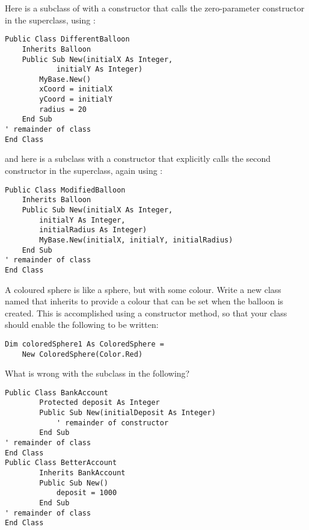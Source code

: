 		Here is a subclass of  with a constructor that calls the zero-parameter constructor in the superclass, using :
		\begin{lstlisting}
Public Class DifferentBalloon
	Inherits Balloon
	Public Sub New(initialX As Integer,
			initialY As Integer)
		MyBase.New()
		xCoord = initialX
		yCoord = initialY
		radius = 20
	End Sub
' remainder of class
End Class
		\end{lstlisting}
		and here is a subclass with a constructor that explicitly calls the second constructor in the superclass, again using :
		\begin{lstlisting}
Public Class ModifiedBalloon
	Inherits Balloon
	Public Sub New(initialX As Integer,
		initialY As Integer,
		initialRadius As Integer)
		MyBase.New(initialX, initialY, initialRadius)
	End Sub
' remainder of class
End Class
		\end{lstlisting}

		\begin{stqb}
			\begin{STQ}
				\item	A coloured sphere is like a sphere, but with some colour. Write a new class named  that inherits  to provide a colour that can be set when the balloon is created. This is accomplished using a constructor method, so that your class should enable the following to be written:
					\begin{lstlisting}
Dim coloredSphere1 As ColoredSphere =
	New ColoredSphere(Color.Red)
					\end{lstlisting}

				\item	What is wrong with the subclass in the following?
					\begin{lstlisting}
Public Class BankAccount
		Protected deposit As Integer
		Public Sub New(initialDeposit As Integer)
			' remainder of constructor
		End Sub
' remainder of class	
End Class
Public Class BetterAccount
		Inherits BankAccount
		Public Sub New()
			deposit = 1000	
		End Sub
' remainder of class
End Class
					\end{lstlisting}
			\end{STQ}
		\end{stqb}



